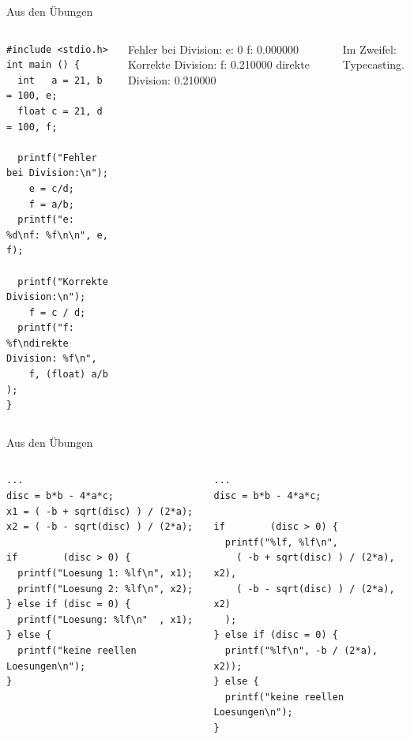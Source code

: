 
\begin{frame}[fragile]{Aus den Übungen}
%
\begin{columns}[T]
\begin{codebox}
\begin{verbatim}
#include <stdio.h>
int main () {
  int   a = 21, b = 100, e;
  float c = 21, d = 100, f;
  
  printf("Fehler bei Division:\n");
    e = c/d;
    f = a/b;
  printf("e: %d\nf: %f\n\n", e, f);
	
  printf("Korrekte Division:\n");
    f = c / d;
  printf("f: %f\ndirekte Division: %f\n", 
    f, (float) a/b  );
}
\end{verbatim}
\end{codebox}
%
\begin{cmdbox}[Ausgabe]
\scriptsize
Fehler bei Division:\newline
e: 0\newline
f: 0.000000\newline
\newline
Korrekte Division:\newline
f: 0.210000\newline
direkte Division: 0.210000
\end{cmdbox}
%
\begin{hintbox}
Im Zweifel: Typecasting.
\end{hintbox}
\end{columns}
%
\end{frame}


\begin{frame}[fragile]{Aus den Übungen}
%
\begin{columns}[T]
\begin{codebox}[Gesehen]
\begin{verbatim}
...
disc = b*b - 4*a*c;
x1 = ( -b + sqrt(disc) ) / (2*a);
x2 = ( -b - sqrt(disc) ) / (2*a);

if        (disc > 0) {
  printf("Loesung 1: %lf\n", x1);
  printf("Loesung 2: %lf\n", x2);
} else if (disc = 0) {
  printf("Loesung: %lf\n"  , x1);
} else {
  printf("keine reellen Loesungen\n");
}
\end{verbatim}
\end{codebox}
%
\begin{codebox}[Empfohlen]
\begin{verbatim}
...
disc = b*b - 4*a*c;

if        (disc > 0) {
  printf("%lf, %lf\n", 
    ( -b + sqrt(disc) ) / (2*a), x2),
    ( -b - sqrt(disc) ) / (2*a), x2)
  );
} else if (disc = 0) {
  printf("%lf\n", -b / (2*a), x2));
} else {
  printf("keine reellen Loesungen\n");
}
\end{verbatim}
\end{codebox}
\end{columns}
%
\end{frame}

